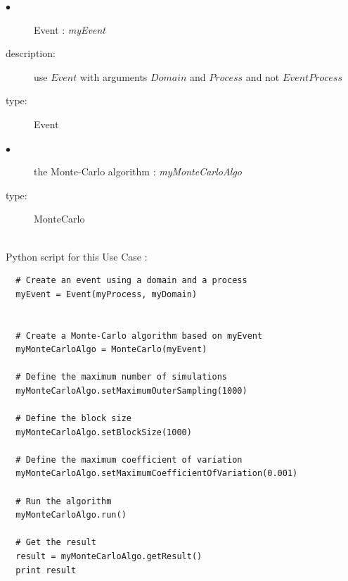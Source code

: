 {
  \begin{description}
  \item[$\bullet$] Event : {\itshape myEvent}
  \item[description:] use $Event$ with arguments $Domain$ and $Process$ and not $EventProcess$ 
  \item[type:] Event
  \end{description}

  \begin{description}
  \item[$\bullet$] the Monte-Carlo algorithm : {\itshape myMonteCarloAlgo}
  \item[type:] MonteCarlo
  \end{description}
}

\textspace\\
Python script for this Use Case :

\begin{lstlisting}
  # Create an event using a domain and a process
  myEvent = Event(myProcess, myDomain)


  # Create a Monte-Carlo algorithm based on myEvent
  myMonteCarloAlgo = MonteCarlo(myEvent)

  # Define the maximum number of simulations
  myMonteCarloAlgo.setMaximumOuterSampling(1000)

  # Define the block size
  myMonteCarloAlgo.setBlockSize(1000)

  # Define the maximum coefficient of variation
  myMonteCarloAlgo.setMaximumCoefficientOfVariation(0.001)

  # Run the algorithm
  myMonteCarloAlgo.run()

  # Get the result
  result = myMonteCarloAlgo.getResult()
  print result
\end{lstlisting}
\textspace\\

